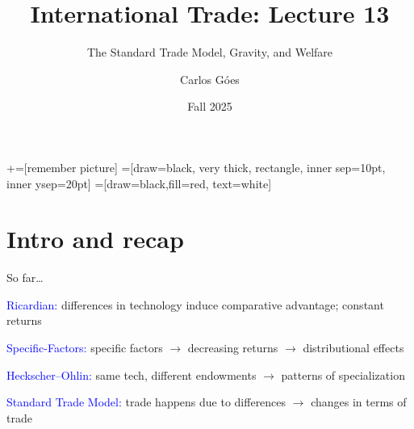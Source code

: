 \documentclass[notes,11pt, aspectratio=169, xcolor=table]{beamer}
\title[]{International Trade: Lecture 13}
\subtitle[]{The Standard Trade Model, Gravity, and Welfare}
\author[Góes]
{Carlos Góes\inst{1}}
\date{Fall 2025}
\institute[GWU]{\inst{1} George Washington University }
\newcommand{\blue}[1]{\textcolor{blue}{#1}}
\newenvironment{wideitemize}{\itemize\addtolength{\itemsep}{10pt}}{\enditemize}
\begin{document}
\newcommand\marktopleft[1]{%
    \tikz[overlay,remember picture] 
        \node (marker-#1-a) at (-.3em,.3em) {};%
}
\newcommand\markbottomright[2]{%
    \tikz[overlay,remember picture] 
        \node (marker-#1-b) at (0em,0em) {};%
}
+=[remember picture] 
 =[draw=black, very thick, rectangle, inner sep=10pt, inner ysep=20pt]
 =[draw=black,fill=red, text=white]















\frame{\titlepage}
\addtocounter{framenumber}{-1}




\section{Intro and recap}

\begin{frame}{So far\ldots}
\begin{wideitemize}
  \item \blue{Ricardian:} differences in technology induce comparative advantage; constant returns
  \item<2-> \blue{Specific-Factors:} specific factors $\rightarrow$ decreasing returns $\rightarrow$ distributional effects
  \item<3-> \blue{Heckscher–Ohlin:} same tech, different endowments $\rightarrow$ patterns of specialization
  \item<4-> \blue{Standard Trade Model:} trade happens due to differences $\rightarrow$ changes in terms of trade 
\end{wideitemize}
\end{frame}
\end{document}
